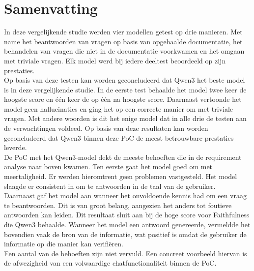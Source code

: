 \section{Samenvatting}
In deze vergelijkende studie werden vier modellen getest op drie manieren. Met name het beantwoorden van vragen op basis van opgehaalde documentatie, het behandelen van vragen die niet in de documentatie voorkwamen en het omgaan met triviale vragen. Elk model werd bij iedere deeltest beoordeeld op zijn prestaties.
\\[1em]
Op basis van deze testen kan worden geconcludeerd dat Qwen3 het beste model is in deze vergelijkende studie. In de eerste test behaalde het model twee keer de hoogste score en één keer de op één na hoogste score. Daarnaast vertoonde het model geen hallucinaties en ging het op een correcte manier om met triviale vragen. Met andere woorden is dit het enige model dat in alle drie de testen aan de verwachtingen voldeed. Op basis van deze resultaten kan worden geconcludeerd dat Qwen3 binnen deze PoC de meest betrouwbare prestaties leverde.
\\[1em]
De PoC met het Qwen3-model dekt de meeste behoeften die in de requirement analyse naar boven kwamen. Ten eerste gaat het model goed om met meertaligheid. Er werden hieromtrent geen problemen vastgesteld. Het model slaagde er consistent in om te antwoorden in de taal van de gebruiker. 
\\[1em]
Daarnaast gaf het model aan wanneer het onvoldoende kennis had om een vraag te beantwoorden. Dit is van groot belang, aangezien het anders tot foutieve antwoorden kan leiden. Dit resultaat sluit aan bij de hoge score voor Faithfulness die Qwen3 behaalde. Wanneer het model een antwoord genereerde, vermeldde het bovendien vaak de bron van de informatie, wat positief is omdat de gebruiker de informatie op die manier kan verifiëren.  
\\[1em] 
Een aantal van de behoeften zijn niet vervuld. Een concreet voorbeeld hiervan is de afwezigheid van een volwaardige chatfunctionaliteit binnen de PoC.